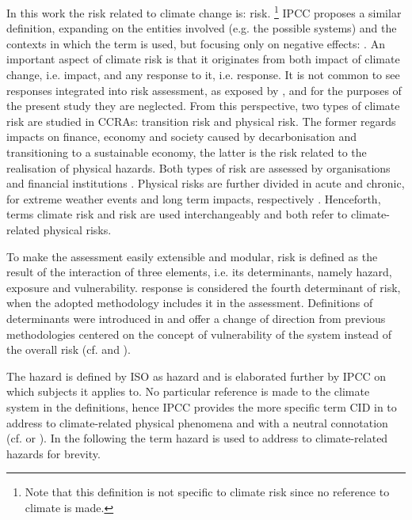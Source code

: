 In this work the \gls{risk} related to climate change is: \glsdesc{risk}.%
\footnote{Note that this definition is not specific to climate \gls{risk} since no reference to climate is made.}
\Gls{IPCC} proposes a similar definition, expanding on the entities involved (e.g. the possible systems) and the contexts in which the term is used, but focusing only on negative effects: .
An important aspect of climate \gls{risk} is that it originates from both \gls{impact} of climate change, i.e. \glsdesc{impact}, and any response to it, i.e. \glsdesc{response}. It is not common to see \glspl{response} integrated into risk assessment, as exposed by \cite[492]{2021SimpsonAFramework}, and for the purposes of the present study they are neglected.
From this perspective, two types of climate \gls{risk} are studied in \glspl{CCRA}: transition risk and physical risk. The former regards \glspl{impact} on finance, economy and society caused by decarbonisation and transitioning to a sustainable economy, the latter is the risk related to the realisation of physical hazards. Both types of risk are assessed by organisations and financial institutions \cite{2023CarlinThe2023,2023CarlinTechnicalSupplement}. Physical risks are further divided in acute and chronic, for extreme weather events and long term impacts, respectively \cite[10]{2023CarlinThe2023}.
Henceforth, terms climate \gls{risk} and risk are used interchangeably and both refer to climate-related physical risks.

To make the assessment easily extensible and modular, \gls{risk} is defined as the result of the interaction of three elements, i.e. its \glspl{determinant}, namely \gls{hazard}, \gls{exposure} and \gls{vulnerability}. \Gls{response} is considered the fourth \gls{determinant} of \gls{risk}, when the adopted methodology includes it in the assessment.
Definitions of \glspl{determinant} were introduced in \cite[69-70]{2012FieldManagingThe} and offer a change of direction from previous methodologies centered on the concept of \gls{vulnerability} of the system instead of the overall \gls{risk} (cf. \cite{2017GIZTheVulnerability} and \cite{2017GIZRiskSupplement}).

The \gls{hazard} is defined by \gls{ISO} as \glsdesc{hazard} and is elaborated further by \gls{IPCC} on which subjects it applies to. No particular reference is made to the climate system in the definitions, hence \gls{IPCC} provides the more specific term \gls{CID} in \cite[2224]{2021MatthewsAnnexVII} to address to climate-related physical phenomena and with a neutral connotation (cf. \cite[10]{2020ReisingerTheConcept} or \cite[1871-1872]{2021RanasingheClimateChange}). In the following the term \gls{hazard} is used to address to climate-related \glspl{hazard} for brevity.

